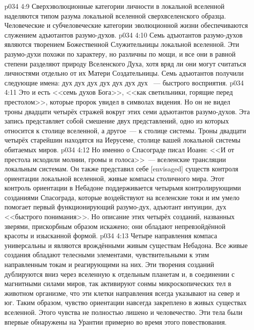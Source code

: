 \vs p034 4:9 Сверхэволюционные категории личности в локальной вселенной наделяются типом разума локальной вселенной сверхвселенского образца. Человеческие и субчеловеческие категории эволюционной жизни обеспечиваются служением адъютантов разумо\hyp{}духов.
\vs p034 4:10 \pc Семь адъютантов разумо\hyp{}духов являются творением Божественной Служительницы локальной вселенной. Эти разумо\hyp{}духи похожи по характеру, но различны по мощи, и все они в равной степени разделяют природу Вселенского Духа, хотя вряд ли  они могут считаться личностями отдельно от их Матери Создательницы. Семь адъютантов получили следующие имена: дух  дух  дух  дух  дух  дух  дух ~--- быстрого восприятия.
\vs p034 4:11 \pc Это и есть <<семь духов Бога>>, <<как светильники, горящие перед престолом>>, которые пророк увидел в символах видения. Но он не видел троны двадцати четырёх стражей вокруг этих семи адъютантов разумо\hyp{}духов. Эта запись представляет собой смешение двух представлений, одно из которых относится к столице вселенной, а другое~--- к столице системы. Троны двадцати четырёх старейшин находятся на Иерусеме, столице вашей локальной системы обитаемых миров.
\vs p034 4:12 Но именно о Спасограде писал Иоанн: <<И от престола исходили молнии, громы и голоса>>~--- вселенские трансляции локальным системам. Он также представил себе [envisaged] существ контроля ориентации локальной вселенной, живые компасы столичного мира. Этот контроль ориентации в Небадоне поддерживается четырьмя контролирующими созданиями Спасограда, которые воздействуют на вселенские токи и им умело помогает первый функционирующий разумо\hyp{}дух, адъютант интуиции, дух <<быстрого понимания>>. Но описание этих четырёх созданий, названных зверями, прискорбным образом искажено; они обладают непревзойдённой красоты и изысканной формой.
\vs p034 4:13 Четыре направления компаса универсальны и являются врождёнными живым существам Небадона. Все живые создания обладают телесными элементами, чувствительными к этим направленным токам и реагирующими на них. Эти творения созданий дублируются вниз через вселенную к отдельным планетам и, в соединении с магнитными силами миров, так активируют сонмы микроскопических тел в животном организме, что эти клетки направления всегда указывают на север и юг. Таким образом, чувство ориентации навсегда закреплено в живых существах вселенной. Этого чувства не полностью лишено и человечество. Эти тела были впервые обнаружены на Урантии примерно во время этого повествования.
